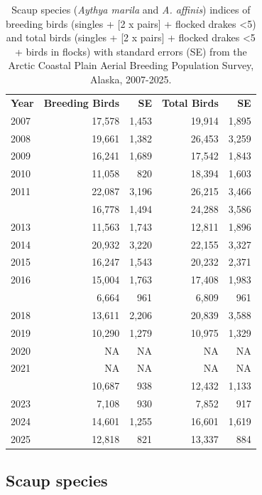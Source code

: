 \documentclass[
]{article}
\begin{document}
\begin{longtable}[t]{lrrrr}

\caption{\label{tbl-UNSC}Scaup species (\emph{Aythya marila} and
\emph{A. affinis}) indices of breeding birds (singles + {[}2 x pairs{]}
+ flocked drakes \textless5) and total birds (singles + {[}2 x pairs{]}
+ flocked drakes \textless5 + birds in flocks) with standard errors (SE)
from the Arctic Coastal Plain Aerial Breeding Population Survey, Alaska,
2007-2025.}

\tabularnewline

\\
\toprule
\textbf{Year} & \textbf{Breeding Birds} & \textbf{SE} & \textbf{Total Birds} & \textbf{SE}\\
\midrule
2007 & 17,578 & 1,453 & 19,914 & 1,895\\
2008 & 19,661 & 1,382 & 26,453 & 3,259\\
2009 & 16,241 & 1,689 & 17,542 & 1,843\\
2010 & 11,058 & 820 & 18,394 & 1,603\\
2011 & 22,087 & 3,196 & 26,215 & 3,466\\
\addlinespace
2012 & 16,778 & 1,494 & 24,288 & 3,586\\
2013 & 11,563 & 1,743 & 12,811 & 1,896\\
2014 & 20,932 & 3,220 & 22,155 & 3,327\\
2015 & 16,247 & 1,543 & 20,232 & 2,371\\
2016 & 15,004 & 1,763 & 17,408 & 1,983\\
\addlinespace
2017 & 6,664 & 961 & 6,809 & 961\\
2018 & 13,611 & 2,206 & 20,839 & 3,588\\
2019 & 10,290 & 1,279 & 10,975 & 1,329\\
2020 & NA & NA & NA & NA\\
2021 & NA & NA & NA & NA\\
\addlinespace
2022 & 10,687 & 938 & 12,432 & 1,133\\
2023 & 7,108 & 930 & 7,852 & 917\\
2024 & 14,601 & 1,255 & 16,601 & 1,619\\
2025 & 12,818 & 821 & 13,337 & 884\\
\bottomrule

\end{longtable}

\endgroup{}

\newpage{}

\subsection*{Scaup species}\label{scaup-species-2}
\end{document}
